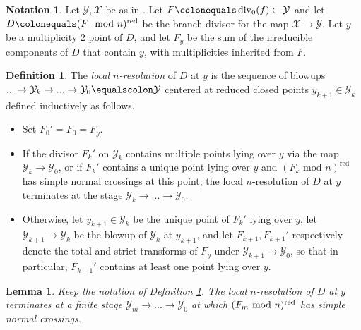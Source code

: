 \documentclass[12pt]{amsart}
\numberwithin{equation}{section}
\newtheorem{lemma}[equation]{Lemma}
\theoremstyle{definition}
\newtheorem{notation}[equation]{Notation}
\newtheorem{defn}[equation]{Definition}
\newcommand{\mc}[1]{\mathcal{#1}}
\renewcommand{\O}{\mathcal{O}}
\newcommand{\Spec}{\mathrm{Spec} \ }
\newcommand{\X}{\mathcal{X}}
\newcommand{\Y}{\mathcal{Y}}
\newcommand{\tx}[1]{\text{#1}}
\DeclareMathOperator{\divi}{div}
\DeclareMathOperator{\red}{red}
\begin{document}
\begin{notation}\label{NSection10}
    Let $\Y,\X$ be as in . Let $F \colonequals \divi_0(f) \subset \mc{Y}$ and let $D \colonequals (F\mod n)^{\red}$ be the branch divisor for the map $\X \rightarrow \Y$. Let $y$ be a multiplicity $2$ point of $D$, and let $F_y$ be the sum of the irreducible components of $D$ that contain $y$, with multiplicities inherited from $F$.
\end{notation}

\begin{defn}\label{dfn: resolution of local branch divisor}    
The \textit{local $n$-resolution} of $D$ at $y$ is the sequence of blowups $...\to\Y_k\to...\to\Y_0 \equalscolon \Y$ centered at reduced closed points $y_{k+1}\in\Y_k$ defined inductively as follows.
    \begin{itemize}
        \item Set $F_0'=F_0=F_y$.
        \item If the divisor $F_k'$ on $\Y_k$ contains multiple points lying over $y$ via the map $\Y_k\to\Y_0$, or if $F_k'$ contains a unique point lying over $y$ and $(F_k\tx{ mod }n)^{\red}$ has simple normal crossings at this point, the local $n$-resolution of $D$ at $y$ terminates at the stage $\Y_k\to...\to\Y_0$.
        \item Otherwise, let $y_{k+1}\in\Y_k$ be the unique point of $F_k'$ lying over $y$, let $\Y_{k+1}\to\Y_k$ be the blowup of $\Y_k$ at $y_{k+1}$, and let $F_{k+1},F_{k+1}'$ respectively denote the total and strict transforms of $F_y$ under $\Y_{k+1}\to\Y_0$, so that in particular, $F_{k+1}'$ contains at least one point lying over $y$.
\end{itemize}
\end{defn}


\begin{lemma}\label{lemma: local resolution is finite} \cite[Proposition 2.15]{Part2}
    Keep the notation of Definition \ref{dfn: resolution of local branch divisor}. The local $n$-resolution of $D$ at $y$ terminates at a finite stage $\Y_m\to...\to\Y_0$ at which $(F_m\textup{ mod }n)^{\red}$ has simple normal crossings.
\end{lemma}
\end{document}
